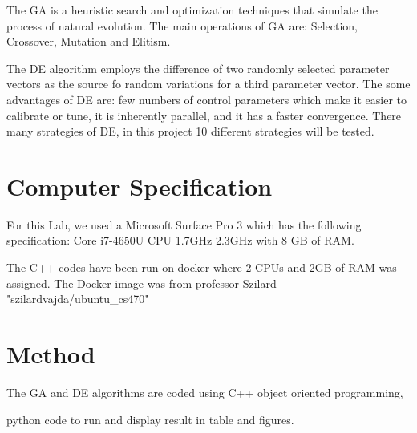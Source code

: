 \documentclass[12pt]{article}
\begin{document}
    The GA is a heuristic search and optimization techniques that simulate the process of natural evolution. The main operations of GA are: Selection, Crossover, Mutation and Elitism.
    
    The DE algorithm employs the difference of two randomly selected parameter vectors as the source fo random variations for a third parameter vector. The some advantages of DE are: few numbers of control parameters which make it easier to calibrate or tune, it is inherently parallel, and it has a faster convergence. 
    There many strategies of DE, in this project 10 different strategies will be tested.
     

    \section{Computer Specification}
     
    For this Lab, we used a Microsoft Surface Pro 3 which has the following specification: Core i7-4650U CPU 1.7GHz 2.3GHz with 8 GB of RAM.
    
    The C++ codes have been run on docker where 2 CPUs and 2GB of RAM was assigned. The Docker image was from professor Szilard "szilardvajda/ubuntu\_cs470"
    
    
    \section{Method}
    
    The GA and DE algorithms are coded using C++ object oriented programming, 
    
    python code to run and display result in table and figures.
    
\end{document}

